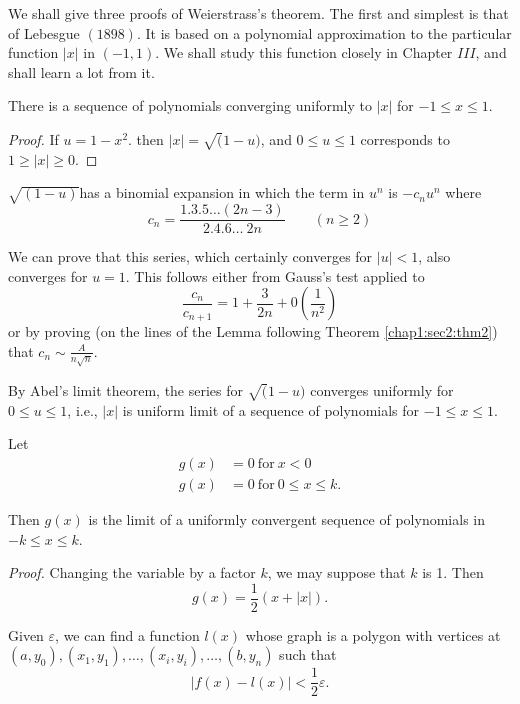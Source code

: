 We shall give three proofs of Weierstrass's theorem. The first and
simplest is that of Lebesgue  $ (1898) $. It is based on a
polynomial  approximation to the particular function $ | x | $ in $ (
-1, 1) $. We shall study this function closely in Chapter $ III $,
and shall learn a lot from it.  

\begin{lemma*}
  There is a  sequence of polynomials converging uniformly to $ | x |
  $ for $ -1 \leq x \leq 1 $. 
\end{lemma*}

\begin{proof}
  If $ u = 1 - x^2 $. then $ | x | = \surd (1 - u) $, and $ 0 \leq u
  \leq 1 $ corresponds to $ 1 \ge | x | \ge 0 $.  
\end{proof}

$\sqrt{(1 -u)}$\pageoriginale has a binomial expansion in which the term in $
u^n $ is $ - c_n u^n $ where  
$$
c_n = \frac{1.3.5 \ldots (2n -3)}{2.4.6 \ldots ~ 2 n} \qquad (n \ge 2)
$$

We can prove that this series, which certainly converges for $ | u | <
1 $, also converges for $ u = 1 $. This follows either from Gauss's
test applied to   
$$ 
\frac{c_n}{c_{n+1}} = 1 + \frac{3}{2 n} + 0 \left(\frac{1}{n^2}\right) 
$$
or by proving (on the lines of the Lemma following
Theorem \ref{chap1:sec2:thm2}) that $ c_n \sim \frac{A}{n \surd n} $. 

By Abel's limit theorem, the series for $ \surd (1 -u) $ converges
uniformly for  $ 0 \leq u \leq 1 $,  i.e., $|x|$ is uniform limit of a
sequence of polynomials for $-1 \leq x \leq 1$. 

\begin{coro*}
  Let 
  \begin{align*}
    g (x) &= 0 ~\text{for}~ x < 0 \\
    g (x) &= 0 ~\text{for}~ 0 \leq x \leq k.
  \end{align*} 
  
  Then $ g (x) $ is the limit of a uniformly convergent sequence of
  polynomials in $ -k \leq x \leq k $. 
\end{coro*}

\noindent \textit{Proof.}
  Changing the variable by a factor $k$, we may suppose that $k$ is 1. Then
  \begin{equation*}
    g (x) = \frac{1}{2} (x+|x|).\tag*{$\Box$}
  \end{equation*}

\begin{proofoftheorem}\label{chap1:sec1:pofthm1}
  Given $ \varepsilon $, we can find  a function $l(x)$ whose graph
  is a polygon with vertices at $ (a, y_0), (x_1, y_1),  \ldots, 
  (x_i, y_i),  \ldots,  (b,  y_n) $ such that  
  $$
  | f (x) - l (x) | < \frac{1}{2} \varepsilon.
  $$
\end{proofoftheorem}

